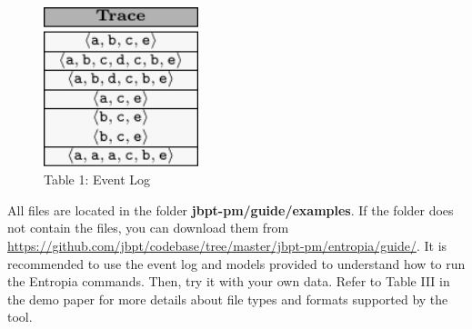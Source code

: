 \begin{figure}[h!]
\begin{center}
\vspace{5mm}
\begin{minipage}{0.45\textwidth}
 \centering
\includegraphics[width=0.40\textwidth]{fig/eventLog.pdf} 
\caption*{ Table 1: Event Log}
\label{fig:Log}
\end{minipage}
\end{center}
\vspace{-4mm}
\end{figure}

All files are located in the folder \textbf{jbpt-pm\slash guide\slash examples}. If the folder does not contain the files, you can download them from \url{https://github.com/jbpt/codebase/tree/master/jbpt-pm/entropia/guide/}. It is recommended to use the event log and models provided to understand how to run the Entropia commands. Then, try it with your own data. Refer to Table III in the demo paper for more details about file types and formats supported by the tool.
